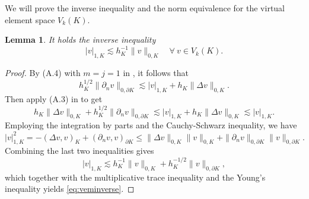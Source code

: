 \documentclass[10pt]{amsart}
\newtheorem{lemma}[theorem]{Lemma}
\numberwithin{equation}{section}
\begin{document}
We will prove the inverse inequality and the norm equivalence for the virtual element space $V_k(K)$.
\begin{lemma}\label{lem:veminverse}
It holds the inverse inequality
\begin{equation}\label{eq:veminverse}
|v|_{1,K}\lesssim h_K^{-1}\|v\|_{0,K}\quad\forall~v\in V_k(K).  
\end{equation}
\end{lemma}
\begin{proof}
By (A.4) with $m=j=1$ in \cite{ChenHuang2020ncvem}, it follows that
\[
h_K^{1/2}\|\partial_nv\|_{0,\partial K}\lesssim |v|_{1,K}+h_K\|\Delta v\|_{0,K}.
\]
Then apply (A.3) in \cite{ChenHuang2020ncvem} to get
\[
h_K\|\Delta v\|_{0,K}+h_K^{1/2}\|\partial_nv\|_{0,\partial K}\lesssim |v|_{1,K}+h_K\|\Delta v\|_{0,K}\lesssim |v|_{1,K}.
\]
Employing the integration by parts and the Cauchy-Schwarz inequality, we have
\[
|v|_{1,K}^2=-(\Delta v,v)_K+(\partial_nv,v)_{\partial K}\leq\|\Delta v\|_{0,K}\|v\|_{0,K}+\|\partial_nv\|_{0,\partial K}\|v\|_{0,\partial K}.
\]
Combining the last two inequalities gives
\[
|v|_{1,K}\lesssim h_K^{-1}\|v\|_{0,K}+h_K^{-1/2}\|v\|_{0,\partial K},
\]
which together with the multiplicative trace inequality and the Young's inequality yields \eqref{eq:veminverse}.
\end{proof}
\end{document}
